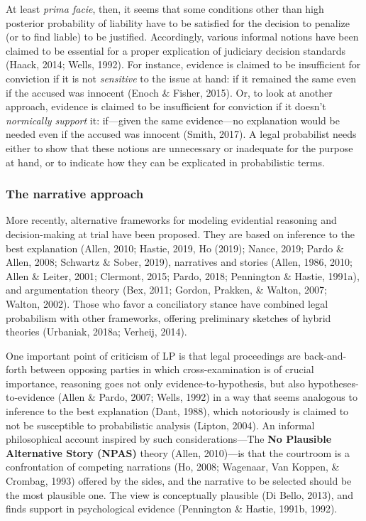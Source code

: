 \documentclass[11pt,dvipsnames,enabledeprecatedfontcommands]{scrartcl}
\begin{document}
At least \emph{prima facie}, then, it seems that some conditions other
than high posterior probability of liability have to be satisfied for
the decision to penalize (or to find liable) to be justified.
Accordingly, various informal notions have been claimed to be essential
for a proper explication of judiciary decision standards (Haack, 2014;
Wells, 1992). For instance, evidence is claimed to be insufficient for
conviction if it is not \emph{sensitive} to the issue at hand: if it
remained the same even if the accused was innocent (Enoch \& Fisher,
2015). Or, to look at another approach, evidence is claimed to be
insufficient for conviction if it doesn't \emph{normically support} it:
if---given the same evidence---no explanation would be needed even if
the accused was innocent (Smith, 2017). A legal probabilist needs either
to show that these notions are unnecessary or inadequate for the purpose
at hand, or to indicate how they can be explicated in probabilistic
terms.

\subsubsection{The narrative approach}\label{the-narrative-approach}

More recently, alternative frameworks for modeling evidential reasoning
and decision-making at trial have been proposed. They are based on
inference to the best explanation (Allen, 2010; Hastie, 2019, Ho (2019);
Nance, 2019; Pardo \& Allen, 2008; Schwartz \& Sober, 2019), narratives
and stories (Allen, 1986, 2010; Allen \& Leiter, 2001; Clermont, 2015;
Pardo, 2018; Pennington \& Hastie, 1991a), and argumentation theory
(Bex, 2011; Gordon, Prakken, \& Walton, 2007; Walton, 2002). Those who
favor a conciliatory stance have combined legal probabilism with other
frameworks, offering preliminary sketches of hybrid theories (Urbaniak,
2018a; Verheij, 2014).

One important point of criticism of LP is that legal proceedings are
back-and-forth between opposing parties in which cross-examination is of
crucial importance, reasoning goes not only evidence-to-hypothesis, but
also hypotheses-to-evidence (Allen \& Pardo, 2007; Wells, 1992) in a way
that seems analogous to inference to the best explanation (Dant, 1988),
which notoriously is claimed to not be susceptible to probabilistic
analysis (Lipton, 2004). An informal philosophical account inspired by
such considerations---The \textbf{No Plausible Alternative Story (NPAS)}
theory (Allen, 2010)---is that the courtroom is a confrontation of
competing narrations (Ho, 2008; Wagenaar, Van Koppen, \& Crombag, 1993)
offered by the sides, and the narrative to be selected should be the
most plausible one. The view is conceptually plausible (Di Bello, 2013),
and finds support in psychological evidence (Pennington \& Hastie,
1991b, 1992).
\end{document}
